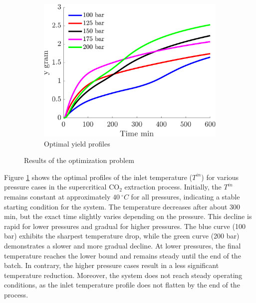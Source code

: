 \documentclass[../Article_Sensitivity_Analsysis.tex]{subfiles}
\begin{document}
\begin{figure}[t!]
\begin{subfigure}[t]{\columnwidth}
			\label{fig:profiles_T}
		\end{subfigure}
		\par\bigskip %
		\begin{subfigure}[t]{\columnwidth}
			\centering
			\includegraphics[width=\columnwidth]{Figures/Results/yield.png}	
			\caption{Optimal yield profiles}
			\label{fig:profiles_y}
		\end{subfigure}
		\caption{Results of the optimization problem}
	\end{figure}	
	
	Figure \ref{fig:profiles_T} shows the optimal profiles of the inlet temperature ($T^{in}$) for various pressure cases in the supercritical CO$_2$ extraction process. Initially, the $T^{in}$ remains constant at approximately $40~^\circ C$ for all pressures, indicating a stable starting condition for the system. The temperature decreases after about 300 min, but the exact time slightly varies depending on the pressure. This decline is rapid for lower pressures and gradual for higher pressures. The blue curve (100 bar) exhibits the sharpest temperature drop, while the green curve (200 bar) demonstrates a slower and more gradual decline. At lower pressures, the final temperature reaches the lower bound and remains steady until the end of the batch. In contrary, the higher pressure cases result in a less significant temperature reduction. Moreover, the system does not reach steady operating conditions, as the inlet temperature profile does not flatten by the end of the process.
\end{document}
